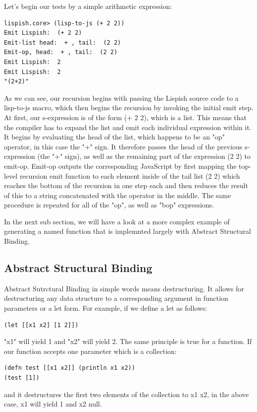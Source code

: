 Let's begin our tests by a simple arithmetic expression:
\begin{verbatim}
lispish.core> (lisp-to-js (+ 2 2))
Emit Lispish:  (+ 2 2)
Emit-list head:  + , tail:  (2 2)
Emit-op, head:  + , tail:  (2 2)
Emit Lispish:  2
Emit Lispish:  2
"(2+2)"
\end{verbatim}
As we can see, our recursion begins with passing the Lispish source code to a lisp-to-js macro, which then begins the recursion by invoking the initial emit step.
At first, our s-expression is of the form (+ 2 2), which is a list. This means that the compiler has to expand the list and emit each individual expression within it. It begins by evaluating the head of the list, which happens to be an "op" operator, in this case the "+" sign. 
It therefore passes the head of the previous s-expression (the "+" sign), as well as the remaining part of the expression (2 2) to emit-op. 
Emit-op outputs the corresponding JavaScript by first mapping the top-level recursion emit function to each element inside of the tail list (2 2) which reaches the bottom of the recursion in one step each and then reduces the result of this to a string concatenated with the operator in the middle.
The same procedure is repeated for all of the "op", as well as "bop" expressions.

In the next sub section, we will have a look at a more complex example of generating a named function that is implemnted largely with Abstract Structural Binding.

\subsection{Abstract Structural Binding}
Abstract Sutrctural Binding in simple words means destructuring. It allows for destructuring any data structure to a corresponding argument in function parameters or a let form.
For example, if we define a let as follows:
\begin{verbatim}
(let [[x1 x2] [1 2]])
\end{verbatim}
"x1" will yield 1 and "x2" will yield 2.
The same principle is true for a function.
If our function accepts one parameter which is a collection:

\begin{verbatim}
(defn test [[x1 x2]] (println x1 x2))
(test [1])
\end{verbatim}
and it destructures the first two elements of the collection to x1 x2, in the above case, x1 will yield 1 and x2 null.


